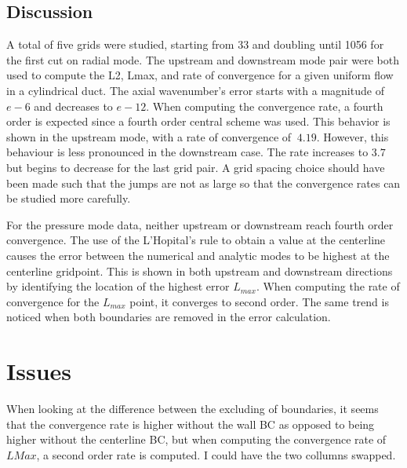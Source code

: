 \documentclass[a4paper]{report}
\begin{document}

\subsection{Discussion}

A total of five grids were studied, starting from 33 and doubling until 1056 for
the first cut on radial mode. The upstream and downstream mode pair were both used
to compute the L2, Lmax, and rate of convergence for a given uniform flow in 
a cylindrical duct. The axial wavenumber's error starts with a magnitude of $e-6$
and decreases to $e-12$. When computing the convergence rate, a fourth order is 
expected since a fourth order central scheme was used. This behavior is shown in
the upstream mode, with a rate of convergence of $~4.19$. However, this behaviour
is less pronounced in the downstream case. The rate increases to $3.7$ but begins
to decrease for the last grid pair. A grid spacing choice should have been made
such that the jumps are not as large so that the convergence rates can be 
studied more carefully.

For the pressure mode data, neither upstream or downstream reach fourth order convergence.
The use of the L'Hopital's rule to obtain a value at the centerline causes the 
error between the numerical and analytic modes to be highest at the centerline
gridpoint. This is shown in both upstream and downstream directions by identifying
the location of the highest error $L_{max}$. When computing the rate of convergence
for the $L_{max}$ point, it converges to second order. The same trend is noticed when 
both boundaries are removed in the error calculation. 

\section{Issues}
When looking at the difference between the excluding of boundaries, it seems that 
the convergence rate is higher without the wall BC as opposed to being higher without 
the centerline BC, but when computing the convergence rate of $LMax$, a second
order rate is computed. I could have the two collumns swapped. 
\end{document}
